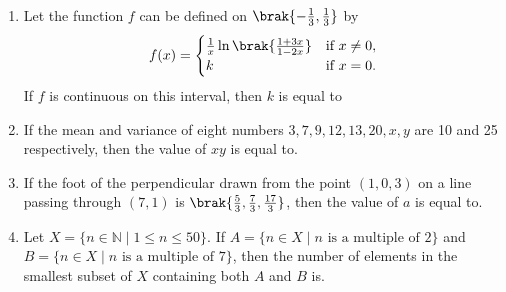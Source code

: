 \documentclass{article}
\begin{document}
\begin{enumerate}
\item Let the function $f$ can be defined on $\brak{ -\frac{1}{3}, \frac{1}{3} }$ by
\[
f(x) =
\begin{cases}
	\frac{1}{x} \ln\brak {\frac{1 + 3x}{1 - 2x} }& \text{if } x \neq 0, \\
k & \text{if } x = 0.\end{cases}
\]
If $f$ is continuous on this interval, then $k$ is equal to\underline{\hspace{1cm}}

\item If the mean and variance of eight numbers $3, 7, 9, 12, 13, 20, x, y$ are 10 and 25 respectively, then the value of $x  y$ is equal to\underline{\hspace{1cm}}.

\item If the foot of the perpendicular drawn from the point $(1, 0, 3)$ on a line passing through $(7,1)$ is $\brak{\frac{5}{3}, \frac{7}{3}, \frac{17}{3}}$, then the value of $a$ is equal to\underline{\hspace{1cm}}.

\item Let $X = \{ n \in \mathbb{N} \mid 1 \leq n \leq 50 \}$. 
If $A = \{ n \in X \mid n \text{ is a multiple of } 2 \}$ and  $B = \{ n \in X \mid n \text{ is a multiple of } 7 \}$,  
then the number of elements in the smallest subset of $X$ containing both $A$ and $B$ is\underline{\hspace{1cm}}.

\end{enumerate}
\end{document}
